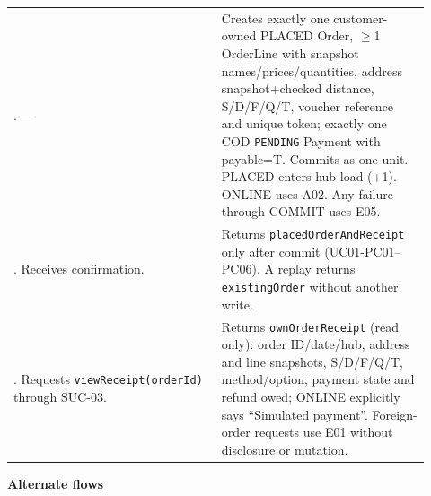 \begin{longtable}{>{\raggedright\arraybackslash}p{0.4600\linewidth}>{\raggedright\arraybackslash}p{0.4600\linewidth}}
7. --- & Creates exactly one customer-owned PLACED Order, \ensuremath{\geq}1 OrderLine with snapshot names/prices/quantities, address snapshot+checked distance, S/D/F/Q/T, voucher reference and unique token; exactly one COD \texttt{PENDING} Payment with payable=T. Commits as one unit. PLACED enters hub load (+1). ONLINE uses A02. Any failure through COMMIT uses E05. \\
8. Receives confirmation. & Returns \texttt{placedOrderAndReceipt} only after commit (UC01-PC01--PC06). A replay returns \texttt{existingOrder} without another write. \\
9. Requests \texttt{viewReceipt(orderId)} through SUC-03. & Returns \texttt{ownOrderReceipt} (read only): order ID/date/hub, address and line snapshots, S/D/F/Q/T, method/option, payment state and refund owed; ONLINE explicitly says ``Simulated payment''. Foreign-order requests use E01 without disclosure or mutation. \\
\end{longtable}
\textbf{Alternate flows}

